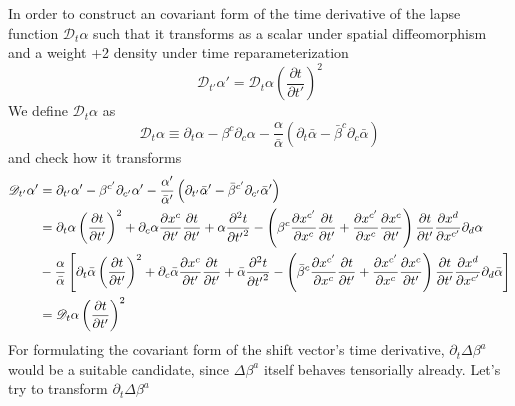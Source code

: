 \documentclass[letterpaper,nofootinbib,prd,amsmath,onecolumn]{revtex4-1}
\begin{document}
In order to construct an covariant form of the time derivative of the lapse function $\mathscr{D}_{t}\alpha$ such that it transforms as a scalar under spatial diffeomorphism and a weight +2 density under time reparameterization
\[
\mathscr{D}_{t'}\alpha' = \mathscr{D}_{t}\alpha\left(\frac{\partial t}{\partial t'}\right)^{2}
\]
We define $\mathscr{D}_{t}\alpha$ as
\begin{equation}
\mathscr{D}_{t}\alpha \equiv \partial_{t}\alpha - \beta^{c}\partial_{c}\alpha - \frac{\alpha}{{\bar \alpha}}\left(\partial_{t}{\bar \alpha} - {\bar \beta}^{c}\partial_{c}{\bar \alpha}\right)
\end{equation}
and check how it transforms
\begin{align}
\mathscr{D}_{t'}\alpha' & = \partial_{t'}\alpha' - \beta^{c'}\partial_{c'}\alpha' - \frac{\alpha'}{{\bar \alpha}'}\left(\partial_{t'}{\bar \alpha}' - {\bar \beta}^{c'}\partial_{c'}{\bar \alpha}'\right)\notag\\
& = \partial_{t}\alpha\left(\frac{\partial t}{\partial t'}\right)^{2} + \partial_{c}\alpha\frac{\partial x^{c}}{\partial t'}\frac{\partial t}{\partial t'} + \alpha\frac{\partial^{2}t}{\partial {t'}^{2}} - \left(\beta^{c}\frac{\partial x^{c'}}{\partial x^{c}}\frac{\partial t}{\partial t'} + \frac{\partial x^{c'}}{\partial x^{c}}\frac{\partial x^{c}}{\partial t'}\right)\frac{\partial t}{\partial t'}\frac{\partial x^{d}}{\partial x^{c'}}\partial_{d}\alpha\notag\\
& - \frac{\alpha}{{\bar \alpha}}\left[\partial_{t}{\bar \alpha}\left(\frac{\partial t}{\partial t'}\right)^{2} + \partial_{c}{\bar \alpha}\frac{\partial x^{c}}{\partial t'}\frac{\partial t}{\partial t'} + {\bar \alpha}\frac{\partial^{2}t}{\partial {t'}^{2}} - \left({\bar\beta}^{c}\frac{\partial x^{c'}}{\partial x^{c}}\frac{\partial t}{\partial t'} + \frac{\partial x^{c'}}{\partial x^{c}}\frac{\partial x^{c}}{\partial t'}\right)\frac{\partial t}{\partial t'}\frac{\partial x^{d}}{\partial x^{c'}}\partial_{d}{\bar\alpha}\right]\notag\\
& = \mathscr{D}_{t}\alpha\left(\frac{\partial t}{\partial t'}\right)^{2}
\end{align}
For formulating the covariant form of the shift vector's time derivative, $\partial_{t}\Delta \beta^{a}$ would be a suitable candidate, since $\Delta \beta^{a}$ itself behaves tensorially already. Let's try to transform $\partial_{t} \Delta \beta^{a}$
\end{document}
